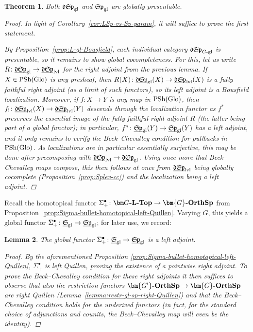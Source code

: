 \documentclass[reqno]{memo-l}
\theoremstyle{mythm}
\newtheorem{thm}{Theorem}[section]
\newtheorem{lemma}[thm]{Lemma}
\theoremstyle{definition}
\numberwithin{equation}{section}
\newcommand{\gl}{\textup{gl}}
\DeclareMathOperator{\PSh}{PSh}
\newcommand{\cat}[1]{\textbf{\textup{#1}}}
\newcommand{\Glo}{\textup{Glo}}
\newcommand{\ulhelper}[2]{\underline{\setbox0=\hbox{$#1#2$}\dp0=0.4pt \box0\relax}}
\newcommand{\ul}[1]{{\mathpalette\ulhelper{#1}}\hbox{\rule[-2pt]{0pt}{0pt}}}
\newcommand{\mySp}{{\mathfrak S\kern-.5pt\mathfrak p}}
\newcommand{\myLSp}{{\mathfrak d\kern-.25pt}\mySp}
\newcommand{\ulmySplev}{\ul{\myLSp}_\textup{lvl}}
\newcommand{\myS}{{{\mathfrak S\kern-.4pt}}}
\newcommand{\Gosp}[1]{\cat{$\bm{#1}$-OrthSp}}
\begin{document}
\begin{thm}\label{thm:gl-sp-pres}
    Both $\ul\myLSp_\gl$ and $\ul\mySp_\gl$ are globally presentable.
    \begin{proof}
        In light of Corollary~\ref{cor:LSp-vs-Sp-param}, it will suffice to prove the first statement. 

        By Proposition~\ref{prop:L-gl-Bousfield}, each individual category $\myLSp_\text{$G$-gl}$ is presentable, so it remains to show global cocompleteness. For this, let us write $R\colon\ul\myLSp_\gl\to\ulmySplev$ for the right adjoint from the previous lemma. If $X\in\PSh(\Glo)$ is any presheaf, then $R(X)\colon\ul\myLSp_\gl(X)\to\ulmySplev(X)$ is a fully faithful right adjoint (as a limit of such functors), so its left adjoint is a Bousfield localization. Moreover, if $f\colon X\to Y$ is any map in $\PSh(\Glo)$, then $f_!\colon\ulmySplev(X)\to\ulmySplev(Y)$ descends through the localization functor as $f^*$ preserves the essential image of the fully faithful right adjoint $R$ (the latter being part of a global functor); in particular, $f^*\colon\ul\mySp_\gl(Y)\to\ul\mySp_\gl(Y)$ has a left adjoint, and it only remains to verify the Beck--Chevalley condition for pullbacks in $\PSh(\Glo)$. As localizations are in particular essentially surjective, this may be done after precomposing with $\ulmySplev\to\ul\myLSp_\gl$. Using once more that Beck--Chevalley maps compose, this then follows at once from $\ulmySplev$ being globally cocomplete (Proposition~\ref{prop:Splev-cc}) and the localization being a left adjoint.
    \end{proof}
\end{thm}

Recall the homotopical functor $\Sigma^\bullet_+\colon\cat{$\bm G$-$\cat{L}$-Top}\to\Gosp{G}$ from Proposition~\ref{prop:Sigma-bullet-homotopical-left-Quillen}. Varying $G$, this yields a global functor $\Sigma^\bullet_+\colon\ul\myS_{\gl}\to\ul\mySp_\gl$; for later use, we record:

\begin{lemma}\label{lemma:sigma-bullet-left-adj}
    The global functor $\Sigma^\bullet_+\colon\ul\myS_\gl\to\ul\mySp_\gl$ is a left adjoint.
    \begin{proof}
        By the aforementioned Proposition \ref{prop:Sigma-bullet-homotopical-left-Quillen}, $\Sigma^\bullet_+$ is left Quillen, proving the existence of a pointwise right adjoint. To prove the Beck--Chevalley condition for these right adjoints it then suffices to observe that also the restriction functors $\Gosp{G'}\to\Gosp{G}$ are right Quillen (Lemma~\ref{lemma:restr-gl-sp-right-Quillen}) and that the Beck--Chevalley condition holds for the underived functors (in fact, for the standard choice of adjunctions and counits, the Beck--Chevalley map will even be the identity).
    \end{proof}
\end{lemma}
\end{document}
